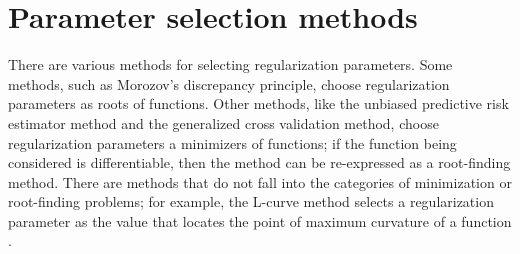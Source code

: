 \documentclass[12pt]{article}
\newcommand{\trans}[1]{{#1}^\mathsf{T}}	%
\DeclareMathOperator{\diag}{diag}	%
\newcommand{\dft}[1]{\widehat{#1}}	%
\begin{document}

\section{Parameter selection methods} \label{sec:Methods}
There are various methods for selecting regularization parameters. Some methods, such as Morozov's discrepancy principle, choose regularization parameters as roots of functions. Other methods, like the unbiased predictive risk estimator method and the generalized cross validation method, choose regularization parameters a minimizers of functions; if the function being considered is differentiable, then the method can be re-expressed as a root-finding method. There are methods that do not fall into the categories of minimization or root-finding problems; for example, the L-curve method selects a regularization parameter as the value that locates the point of maximum curvature of a function \cite{Hansen1992,HansenOLeary}.
\end{document}
